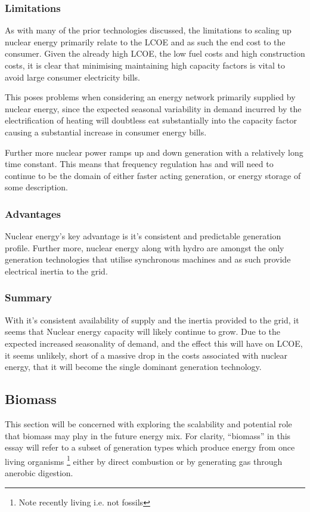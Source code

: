 \documentclass[11pt]{article}
\numberwithin{equation}{section}
\begin{document}
\subsubsection{Limitations}
\label{sec:org7013eeb}
As with many of the prior technologies discussed, the limitations to scaling up nuclear energy primarily relate to the LCOE and as such the end cost to the consumer.  Given the already high LCOE, the low fuel costs and high construction costs, it is clear that minimising maintaining high capacity factors is vital to avoid large consumer electricity bills.

This poses problems when considering an energy network primarily supplied by nuclear energy, since the expected seasonal variability in demand incurred by the electrification of heating will doubtless eat substantially into the capacity factor causing a substantial increase in consumer energy bills.

Further more nuclear power ramps up and down generation with a relatively long time constant. This means that frequency regulation has and will need to continue to be the domain of either faster acting generation, or energy storage of some description.

\subsubsection{Advantages}
\label{sec:org1b8693f}
Nuclear energy's key advantage is it's consistent and predictable generation profile. Further more, nuclear energy along with hydro are amongst the only generation technologies that utilise synchronous machines and as such provide electrical inertia to the grid.

\subsubsection{Summary}
\label{sec:org9481912}
With it's consistent availability of supply and the inertia provided to the grid, it seems that Nuclear energy capacity will likely continue to grow. Due to the expected increased seasonality of demand, and the effect this will have on LCOE, it seems unlikely, short of a massive drop in the costs associated with nuclear energy, that it will become the single dominant generation technology.

\subsection{Biomass \label{secBioGas}}
\label{sec:org2a34224}
This section will be concerned with exploring the scalability and potential role that biomass may play in the future energy mix. For clarity, ``biomass'' in this essay will refer to a subset of generation types which produce energy from once living organisms \footnote{Note recently living i.e. not fossils} either by direct combustion or by generating gas through anerobic digestion.
\end{document}
